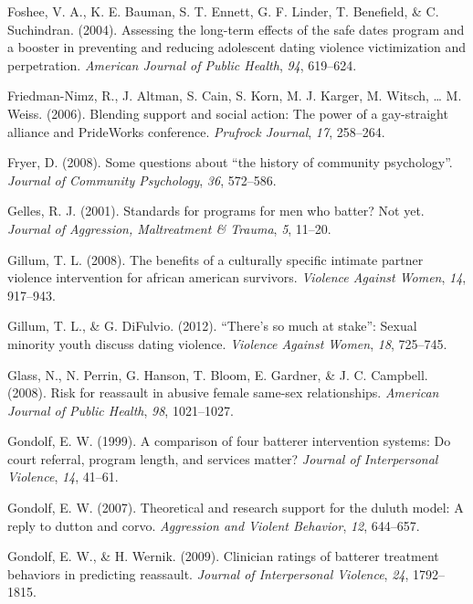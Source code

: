 \documentclass[11pt,]{tufte-book}
\begin{document}
\hypertarget{ref-foshee2004assessing}{}
Foshee, V. A., K. E. Bauman, S. T. Ennett, G. F. Linder, T. Benefield,
\& C. Suchindran. (2004). Assessing the long-term effects of the safe
dates program and a booster in preventing and reducing adolescent dating
violence victimization and perpetration. \emph{American Journal of
Public Health}, \emph{94}, 619--624.

\hypertarget{ref-friedman-nimz2006blending}{}
Friedman-Nimz, R., J. Altman, S. Cain, S. Korn, M. J. Karger, M. Witsch,
\ldots{} M. Weiss. (2006). Blending support and social action: The power
of a gay-straight alliance and PrideWorks conference. \emph{Prufrock
Journal}, \emph{17}, 258--264.

\hypertarget{ref-fryer2008some}{}
Fryer, D. (2008). Some questions about ``the history of community
psychology''. \emph{Journal of Community Psychology}, \emph{36},
572--586.

\hypertarget{ref-gelles2001standards}{}
Gelles, R. J. (2001). Standards for programs for men who batter? Not
yet. \emph{Journal of Aggression, Maltreatment \& Trauma}, \emph{5},
11--20.

\hypertarget{ref-gillum2008benefits}{}
Gillum, T. L. (2008). The benefits of a culturally specific intimate
partner violence intervention for african american survivors.
\emph{Violence Against Women}, \emph{14}, 917--943.

\hypertarget{ref-gillum2012there}{}
Gillum, T. L., \& G. DiFulvio. (2012). ``There's so much at stake'':
Sexual minority youth discuss dating violence. \emph{Violence Against
Women}, \emph{18}, 725--745.

\hypertarget{ref-glass2008risk}{}
Glass, N., N. Perrin, G. Hanson, T. Bloom, E. Gardner, \& J. C.
Campbell. (2008). Risk for reassault in abusive female same-sex
relationships. \emph{American Journal of Public Health}, \emph{98},
1021--1027.

\hypertarget{ref-gondolf1999comparison}{}
Gondolf, E. W. (1999). A comparison of four batterer intervention
systems: Do court referral, program length, and services matter?
\emph{Journal of Interpersonal Violence}, \emph{14}, 41--61.

\hypertarget{ref-gondolf2007theoretical}{}
Gondolf, E. W. (2007). Theoretical and research support for the duluth
model: A reply to dutton and corvo. \emph{Aggression and Violent
Behavior}, \emph{12}, 644--657.

\hypertarget{ref-gondolf2009clinician}{}
Gondolf, E. W., \& H. Wernik. (2009). Clinician ratings of batterer
treatment behaviors in predicting reassault. \emph{Journal of
Interpersonal Violence}, \emph{24}, 1792--1815.
\end{document}
